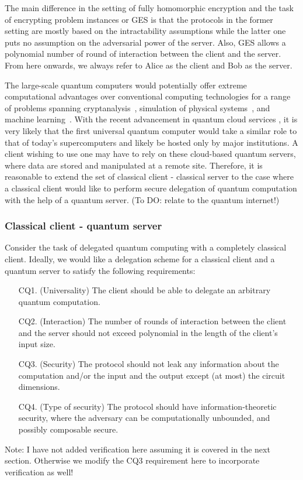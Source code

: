 The main difference in the setting of fully homomorphic encryption and the task of encrypting problem instances or GES is that the protocols in the former setting are mostly based on the intractability assumptions while the latter one puts no assumption on the adversarial power of the server. Also, GES allows a polynomial number of round of interaction between the client and the server. From here onwards, we always refer to Alice as the client and Bob as the server. 

The large-scale quantum computers would potentially offer extreme computational advantages over conventional computing technologies for a range of problems spanning cryptanalysis~\cite{shor1999polynomial}, simulation of physical systems~\cite{lloyd1996universal}, and machine learning~\cite{biamonte2017quantum}.  With the recent advancement in quantum cloud services \cite{IBM2016, Rigetti2017}, it is very likely that the first universal quantum computer would take a similar role to that of today's supercomputers and likely be hosted only by major institutions. A client wishing to use one may have to rely on these cloud-based quantum servers, where data are stored and manipulated at a remote site. Therefore, it is reasonable to extend the set of classical client - classical server to the case where a classical client would like to perform secure delegation of quantum computation with the help of a quantum server. (To DO: relate to the quantum internet!)
 

\subsubsection{Classical client - quantum server}
Consider the task of delegated quantum computing with a completely classical client. Ideally, we would like a delegation scheme for a classical client and a quantum server to satisfy the following requirements:
\begin{enumerate}
\item[CQ1.] (Universality) The client should be able to delegate an arbitrary quantum computation. 
\item[CQ2.] (Interaction) The number of rounds of interaction between the client and the server should not exceed polynomial in the length of the client's input size.
\item[CQ3.] (Security)  The protocol should not leak any information about the computation and/or the input and the output except (at most) the circuit dimensions.
\item[CQ4.] (Type of security) The protocol should have information-theoretic security, where the adversary can be computationally unbounded, and possibly composable secure. 
\end{enumerate}
Note: I have not added verification here assuming it is covered in the next section. Otherwise we modify the CQ3 requirement here to incorporate verification as well!

